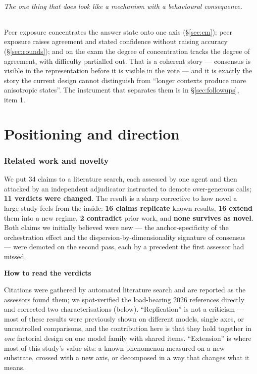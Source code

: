 \documentclass[10pt,a4paper]{article}
\newenvironment{aside}[1]{%
  \par\medskip\noindent
  \begin{lrbox}{\asidebox}%
  \begin{minipage}{\dimexpr\linewidth-2\fboxsep\relax}%
  \small\textbf{\textcolor{accent}{#1}}\par\smallskip\small
}{%
  \end{minipage}%
  \end{lrbox}%
  \noindent\colorbox{panel}{\usebox{\asidebox}}\par\medskip
}
\begin{document}
\paragraph{The one thing that does look like a mechanism with a behavioural consequence.} Peer exposure concentrates the answer state onto one axis (\S\ref{sec:cm}); peer exposure raises agreement and stated confidence without raising accuracy (\S\ref{sec:rounds}); and on the exam the degree of concentration tracks the degree of agreement, with difficulty partialled out. That is a coherent story --- consensus is visible in the representation before it is visible in the vote --- and it is exactly the story the current design cannot distinguish from ``longer contexts produce more anisotropic states''. The instrument that separates them is in \S\ref{sec:followups}, item 1.

\part{Positioning and direction}\label{part:pos}

\section{Related work and novelty}\label{sec:novelty}

We put 34 claims to a literature search, each assessed by one agent and then attacked by an independent adjudicator instructed to demote over-generous calls; \textbf{11 verdicts were changed}. The result is a sharp corrective to how novel a large study feels from the inside: \textbf{16 claims replicate} known results, \textbf{16 extend} them into a new regime, \textbf{2 contradict} prior work, and \textbf{none survives as novel}. Both claims we initially believed were new --- the anchor-specificity of the orchestration effect and the dispersion-by-dimensionality signature of consensus --- were demoted on the second pass, each by a precedent the first assessor had missed.

\begin{aside}{How to read the verdicts}
Citations were gathered by automated literature search and are reported as the assessors found them; we spot-verified the load-bearing 2026 references directly and corrected two characterisations (below). ``Replication'' is not a criticism --- most of these results were previously shown on different models, single axes, or uncontrolled comparisons, and the contribution here is that they hold together in \emph{one} factorial design on one model family with shared items. ``Extension'' is where most of this study's value sits: a known phenomenon measured on a new substrate, crossed with a new axis, or decomposed in a way that changes what it means.
\end{aside}
\end{document}
